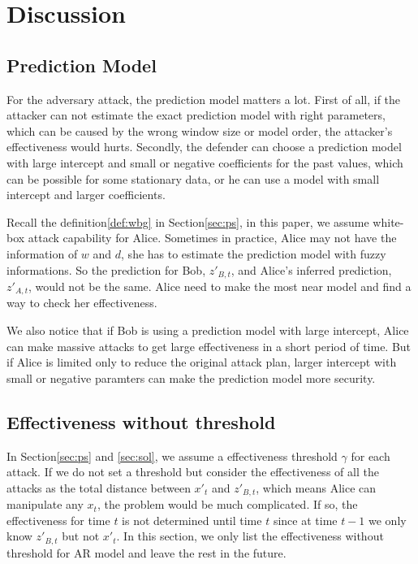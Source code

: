 \documentclass[journal]{IEEEtran}
\begin{document}
{\color{purple}
\section{Discussion}\label{sec:dis}

\subsection{Prediction Model}
For the adversary attack, the prediction model matters a lot. First of all, if the attacker can not estimate the exact prediction model with right parameters, which can be caused by the wrong window size or model order, the attacker's effectiveness would hurts. Secondly, the defender can choose a prediction model with large intercept and small or negative coefficients for the past values, which can be possible for some stationary data, or he can use a model with small intercept and larger coefficients.

Recall the definition\ref{def:wbg} in Section\ref{sec:ps}, in this paper, we assume white-box attack capability for Alice. Sometimes in practice, Alice may not have the information of $w$ and $d$, she has to estimate the prediction model with fuzzy informations. So the prediction for Bob, $z'_{B,t}$, and Alice's inferred prediction, $z'_{A,t}$, would not be the same. Alice need to make the most near model and find a way to check her effectiveness.

We also notice that if Bob is using a prediction model with large intercept, Alice can make massive attacks to get large effectiveness in a short period of time. But if Alice is limited only to reduce the original attack plan, larger intercept with small or negative paramters can make the prediction model more security.

\subsection{Effectiveness without threshold}

In Section\ref{sec:ps} and \ref{sec:sol}, we assume a effectiveness threshold $\gamma$ for each attack. If we do not set a threshold but consider the effectiveness of all the attacks as the total distance between $x'_t$ and $z'_{B,t}$, which means Alice can manipulate any $x_t$, the problem would be much complicated. If so, the effectiveness for time $t$ is not determined until time $t$ since at time $t-1$ we only know $z'_{B,t}$ but not $x'_t$. In this section, we only list the effectiveness without threshold for AR model and leave the rest in the future.

}
\end{document}
